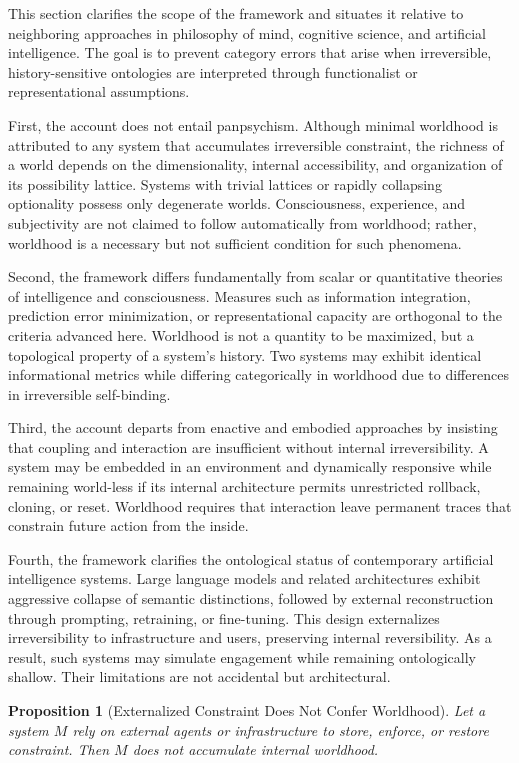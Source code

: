 \documentclass[11pt]{article}
\newtheorem{proposition}{Proposition}
\theoremstyle{remark}
\begin{document}
This section clarifies the scope of the framework and situates it relative to neighboring approaches in philosophy of mind, cognitive science, and artificial intelligence. The goal is to prevent category errors that arise when irreversible, history-sensitive ontologies are interpreted through functionalist or representational assumptions.

First, the account does not entail panpsychism. Although minimal worldhood is attributed to any system that accumulates irreversible constraint, the richness of a world depends on the dimensionality, internal accessibility, and organization of its possibility lattice. Systems with trivial lattices or rapidly collapsing optionality possess only degenerate worlds. Consciousness, experience, and subjectivity are not claimed to follow automatically from worldhood; rather, worldhood is a necessary but not sufficient condition for such phenomena.

Second, the framework differs fundamentally from scalar or quantitative theories of intelligence and consciousness. Measures such as information integration, prediction error minimization, or representational capacity are orthogonal to the criteria advanced here. Worldhood is not a quantity to be maximized, but a topological property of a system’s history. Two systems may exhibit identical informational metrics while differing categorically in worldhood due to differences in irreversible self-binding.

Third, the account departs from enactive and embodied approaches by insisting that coupling and interaction are insufficient without internal irreversibility. A system may be embedded in an environment and dynamically responsive while remaining world-less if its internal architecture permits unrestricted rollback, cloning, or reset. Worldhood requires that interaction leave permanent traces that constrain future action from the inside.

Fourth, the framework clarifies the ontological status of contemporary artificial intelligence systems. Large language models and related architectures exhibit aggressive collapse of semantic distinctions, followed by external reconstruction through prompting, retraining, or fine-tuning. This design externalizes irreversibility to infrastructure and users, preserving internal reversibility. As a result, such systems may simulate engagement while remaining ontologically shallow. Their limitations are not accidental but architectural.

\begin{proposition}[Externalized Constraint Does Not Confer Worldhood]
Let a system $M$ rely on external agents or infrastructure to store, enforce, or restore constraint. Then $M$ does not accumulate internal worldhood.
\end{proposition}
\end{document}
